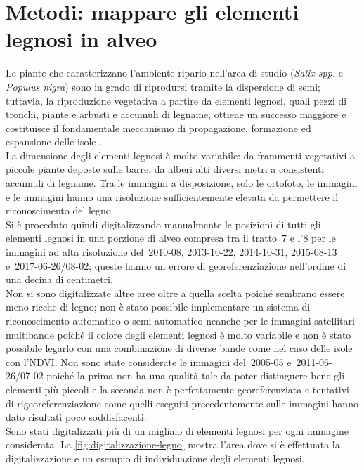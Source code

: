 \section{Metodi: mappare gli elementi legnosi in alveo}
Le piante che caratterizzano l'ambiente ripario nell'area di studio (\emph{Salix spp.} e \emph{Populus nigra}) sono in grado di riprodursi tramite la dispersione di semi;
tuttavia, la riproduzione vegetativa a partire da elementi legnosi, quali pezzi di tronchi, piante e arbusti e accumuli di legname, ottiene un successo maggiore e costituisce il fondamentale meccanismo di propagazione, formazione ed espansione delle isole .
\\
La dimensione degli elementi legnosi è molto variabile: da frammenti vegetativi a piccole piante deposte sulle barre, da alberi alti diversi metri a consistenti accumuli di legname.
Tra le immagini a disposizione, solo le ortofoto, le immagini \Pl{} e le immagini \WV{} hanno una risoluzione sufficientemente elevata da permettere il riconoscimento del legno.
\\
Si è proceduto quindi digitalizzando manualmente le posizioni di tutti gli elementi legnosi in una porzione di alveo compresa tra il tratto~7 e l'8 per le immagini ad alta risoluzione del~2010-08, 2013-10-22, 2014-10-31, 2015-08-13 e~2017-06-26/08-02; queste hanno un errore di georeferenziazione nell'ordine di una decina di centimetri.
\\
Non si sono digitalizzate altre aree oltre a quella scelta poiché sembrano essere meno ricche di legno; non è stato possibile implementare un sistema di riconoscimento automatico o semi-automatico neanche per le immagini satellitari multibande poiché il colore degli elementi legnosi è molto variabile e non è stato possibile legarlo con una combinazione di diverse bande come nel caso delle isole con l'NDVI.
Non sono state considerate le immagini del~2005-05 e~2011-06-26/07-02 poiché la prima non ha una qualità tale da poter distinguere bene gli elementi più piccoli e la seconda non è perfettamente georeferenziata e tentativi di rigeoreferenziazione come quelli eseguiti precedentemente sulle immagini \AST{} hanno dato risultati poco soddisfacenti.
\\
Sono stati digitalizzati più di un migliaio di elementi legnosi per ogni immagine considerata.
La \cref{fig:digitalizzazione-legno} mostra l'area dove si è effettuata la digitalizzazione e un esempio di individuazione degli elementi legnosi.
%
